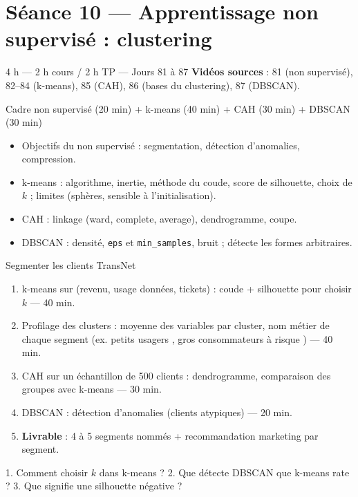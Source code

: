 \documentclass[11pt,a4paper]{article}
\begin{document}
\section*{Séance 10 — Apprentissage non supervisé : clustering}
\begin{seancebox}{4 h — 2 h cours / 2 h TP — Jours 81 à 87}
\textbf{Vidéos sources} : 81 (non supervisé), 82--84 (k-means), 85 (CAH), 86 (bases du clustering), 87 (DBSCAN).
\end{seancebox}
\begin{coursbox}{Cadre non supervisé (20 min) + k-means (40 min) + CAH (30 min) + DBSCAN (30 min)}
\begin{itemize}[nosep]
\item Objectifs du non supervisé : segmentation, détection d'anomalies, compression.
\item k-means : algorithme, inertie, méthode du coude, score de silhouette, choix de $k$ ; limites (sphères, sensible à l'initialisation).
\item CAH : linkage (ward, complete, average), dendrogramme, coupe.
\item DBSCAN : densité, \texttt{eps} et \texttt{min\_samples}, bruit ; détecte les formes arbitraires.
\end{itemize}
\end{coursbox}
\begin{tpbox}{Segmenter les clients TransNet}
\begin{enumerate}[nosep]
\item k-means sur (revenu, usage données, tickets) : coude + silhouette pour choisir $k$ — 40 min.
\item Profilage des clusters : moyenne des variables par cluster, nom métier de chaque segment (ex. \og petits usagers \fg{}, \og gros consommateurs à risque \fg{}) — 40 min.
\item CAH sur un échantillon de 500 clients : dendrogramme, comparaison des groupes avec k-means — 30 min.
\item DBSCAN : détection d'anomalies (clients atypiques) — 20 min.
\item \textbf{Livrable} : 4 à 5 segments nommés + recommandation marketing par segment.
\end{enumerate}
\end{tpbox}
\begin{evalbox}
1. Comment choisir $k$ dans k-means ? 2. Que détecte DBSCAN que k-means rate ? 3. Que signifie une silhouette négative ?
\end{evalbox}
\end{document}
